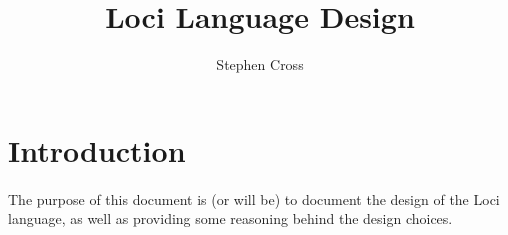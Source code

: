 \documentclass{article}
\title{Loci Language Design}
\author{Stephen Cross}
\date{}
\begin{document}
\maketitle

\section{Introduction}

\paragraph{}
The purpose of this document is (or will be) to document the design of the Loci language, as well as providing some reasoning behind the design choices.
\end{document}
